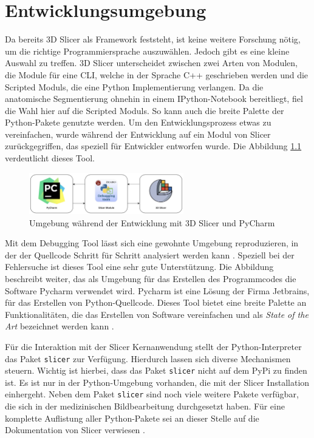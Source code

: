 \chapter{Entwicklungsumgebung}
\label{chap:entwicklungsumgebung} Da bereits 3D Slicer als Framework feststeht,
ist keine weitere Forschung nötig, um die richtige Programmiersprache auszuwählen.
Jedoch gibt es eine kleine Auswahl zu treffen. 3D Slicer unterscheidet zwischen zwei
Arten von Modulen, die Module für eine \ac{CLI}, welche in der Sprache C++
geschrieben werden und die Scripted Moduls, die eine Python Implementierung verlangen.
Da die anatomische Segmentierung ohnehin in einem IPython-Notebook bereitliegt, fiel
die Wahl hier auf die Scripted Moduls. So kann auch die breite Palette der
Python-Pakete genutzte werden. Um den Entwicklungsprozess etwas zu vereinfachen,
wurde während der Entwicklung auf ein Modul von Slicer zurückgegriffen, das speziell
für Entwickler entworfen wurde. Die Abbildung \ref{fig:entwicklungsumgebung}
verdeutlicht dieses Tool.

\begin{figure}[h]
	\centering
	\includegraphics[width=0.6\textwidth]{img/Entwicklungsumgebung.png}
	\caption{Umgebung während der Entwicklung mit 3D Slicer und PyCharm}
	\label{fig:entwicklungsumgebung}
\end{figure}

Mit dem Debugging Tool lässt sich eine gewohnte Umgebung reproduzieren, in der
der Quellcode Schritt für Schritt analysiert werden kann \citep[vgl.][]{slicerdebuggingtools}.
Speziell bei der Fehlersuche ist dieses Tool eine sehr gute Unterstützung. Die Abbildung
beschreibt weiter, das als Umgebung für das Erstellen des Programmcodes die
Software Pycharm verwendet wird. Pycharm ist eine Lösung der Firma Jetbrains,
für das Erstellen von Python-Quellcode. Dieses Tool bietet eine breite Palette an
Funktionalitäten, die das Erstellen von Software vereinfachen und als \textit{State
of the Art} bezeichnet werden kann \citep[vgl.][]{jetbrains2024}.

Für die Interaktion mit der Slicer Kernanwendung stellt der Python-Interpreter
das Paket \texttt{slicer} zur Verfügung. Hierdurch lassen sich diverse
Mechanismen steuern. Wichtig ist hierbei, dass das Paket \texttt{slicer} nicht auf
dem \ac{PyPi} zu finden ist. Es ist nur in der Python-Umgebung vorhanden, die
mit der Slicer Installation einhergeht. Neben dem Paket \texttt{slicer} sind
noch viele weitere Pakete verfügbar, die sich in der medizinischen Bildbearbeitung
durchgesetzt haben. Für eine komplette Auflistung aller Python-Pakete sei an
dieser Stelle auf die Dokumentation von Slicer verwiesen \citep[vgl.][]{slicer2024}.

